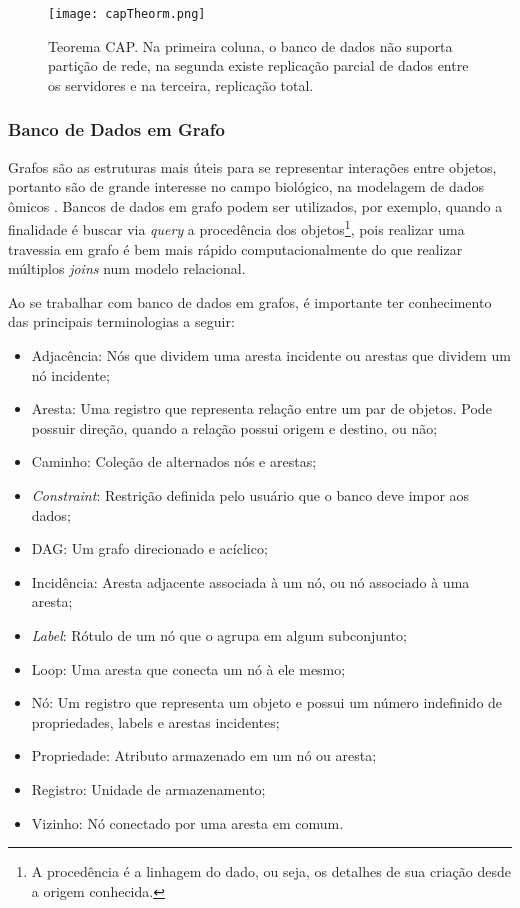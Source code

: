 \begin{figure}[h]
    \centering
    \texttt{[image: capTheorm.png]}
    \caption{Teorema CAP. Na primeira coluna, o banco de dados não suporta partição de rede, na segunda existe replicação parcial de dados entre os servidores e na terceira, replicação total. \cite{CAPTheorem}}
    \label{fig:capTheorm}
\end{figure} 

\subsubsection{Banco de Dados em Grafo}

\indent Grafos são as estruturas mais úteis para se representar interações entre objetos, portanto são de grande interesse no campo biológico, na modelagem de dados ômicos \cite{vicknair10}. Bancos de dados em grafo podem ser utilizados, por exemplo, quando a finalidade é buscar via \textit{query} a procedência dos objetos\footnote{A procedência é a linhagem do dado, ou seja, os detalhes de sua criação desde a origem conhecida.}, pois realizar uma travessia em grafo é bem mais rápido computacionalmente do que realizar múltiplos \textit{joins} num modelo relacional.

\indent Ao se trabalhar com banco de dados em grafos, é importante ter conhecimento das principais terminologias a seguir:
\begin{itemize}
\item Adjacência: Nós que dividem uma aresta incidente ou arestas que dividem um nó incidente;
\item Aresta: Uma registro que representa relação entre um par de objetos. Pode possuir direção, quando a relação possui origem e destino, ou não;
\item Caminho: Coleção de alternados nós e arestas;
\item \textit{Constraint}: Restrição definida pelo usuário que o banco deve impor aos dados;
\item DAG: Um grafo direcionado e acíclico;
\item Incidência: Aresta adjacente associada à um nó, ou nó associado à uma aresta;
\item \textit{Label}: Rótulo de um nó que o agrupa em algum subconjunto; 
\item Loop: Uma aresta que conecta um nó à ele mesmo;
\item Nó: Um registro que representa um objeto e possui um número indefinido de propriedades, labels e arestas incidentes;
\item Propriedade: Atributo armazenado em um nó ou aresta;
\item Registro: Unidade de armazenamento;
\item Vizinho: Nó conectado por uma aresta em comum.
\end{itemize}

